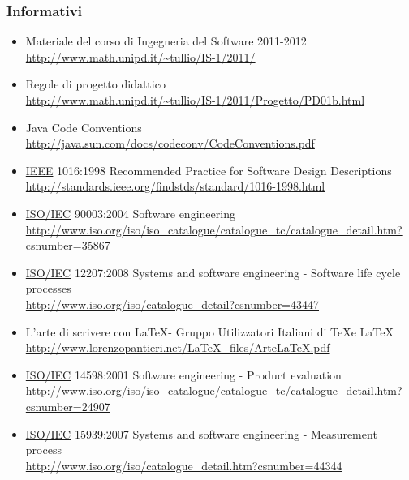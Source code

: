 \documentclass[a4paper,11pt]{article}
\begin{document}
\subsubsection{Informativi}
\begin{itemize}
\item Materiale del corso di Ingegneria del Software 2011-2012 \\
\url{http://www.math.unipd.it/~tullio/IS-1/2011/}
\item Regole di progetto didattico\\
\url{http://www.math.unipd.it/~tullio/IS-1/2011/Progetto/PD01b.html}
\item Java Code Conventions\\
\url{http://java.sun.com/docs/codeconv/CodeConventions.pdf}
\item \underline{IEEE} 1016:1998 Recommended Practice for Software Design Descriptions \\
\url{http://standards.ieee.org/findstds/standard/1016-1998.html}
\item \underline{ISO/IEC} 90003:2004 Software engineering \\
\url{http://www.iso.org/iso/iso_catalogue/catalogue_tc/catalogue_detail.htm?csnumber=35867}
\item \underline{ISO/IEC} 12207:2008 Systems and software engineering - Software life cycle processes \\
\url{http://www.iso.org/iso/catalogue_detail?csnumber=43447}

\item L'arte di scrivere con \LaTeX - Gruppo Utilizzatori Italiani di \TeX e \LaTeX \\
\url{http://www.lorenzopantieri.net/LaTeX_files/ArteLaTeX.pdf}
\item \underline{ISO/IEC} 14598:2001 Software engineering - Product evaluation\\
\url{http://www.iso.org/iso/iso_catalogue/catalogue_tc/catalogue_detail.htm?csnumber=24907}
\item \underline{ISO/IEC} 15939:2007 Systems and software engineering - Measurement process\\
\url{http://www.iso.org/iso/catalogue_detail.htm?csnumber=44344}
\end{itemize}
\end{document}
